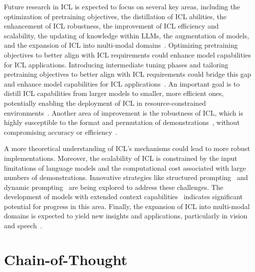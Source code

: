 Future research in ICL is expected to focus on several key areas, including the optimization of pretraining objectives, the distillation of ICL abilities, the enhancement of ICL robustness, the improvement of ICL efficiency and scalability, the updating of knowledge within LLMs, the augmentation of models, and the expansion of ICL into multi-modal domains~\cite{dong2023survey}.
Optimizing pretraining objectives to better align with ICL requirements could enhance model capabilities for ICL applications.
Introducing intermediate tuning phases and tailoring pretraining objectives to better align with ICL requirements could bridge this gap and enhance model capabilities for ICL applications~\cite{shin2022effect}.
An important goal is to distill ICL capabilities from larger models to smaller, more efficient ones, potentially enabling the deployment of ICL in resource-constrained environments~\cite{magister2022teaching}.
Another area of improvement is the robustness of ICL, which is highly susceptible to the format and permutation of demonstrations~\cite{zhao2021calibrate, lu2022fantastically}, without compromising accuracy or efficiency~\cite{chen2024relation}.

A more theoretical understanding of ICL's mechanisms could lead to more robust implementations.
Moreover, the scalability of ICL is constrained by the input limitations of language models and the computational cost associated with large numbers of demonstrations.
Innovative strategies like structured prompting~\cite{hao2022structured} and dynamic prompting~\cite{wang2023efficient} are being explored to address these challenges.
The development of models with extended context capabilities~\cite{li2023contextual} indicates significant potential for progress in this area.
Finally, the expansion of ICL into multi-modal domains is expected to yield new insights and applications, particularly in vision and speech~\cite{dong2023survey}.


\section{Chain-of-Thought}
\label{sec:chain-of-thought}

